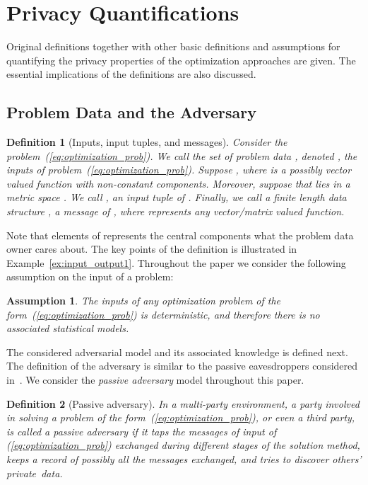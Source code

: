 \documentclass[12pt,draftcls,onecolumn]{IEEEtran}
\newtheorem{defin}{Definition}\newtheorem{assump}{Assumption}
\newcommand{\add}[1]{{{\color{blue!0!black}#1}}}
\newcommand{\addnew}[1]{{{\color{blue!0!black}#1}}}
\begin{document}
\section{Privacy Quantifications}\label{sec:definitions}

\addnew{Original definitions together with other basic definitions and assumptions for quantifying the privacy properties of the optimization approaches are given. The essential implications of the definitions are also discussed.}

\addnew{
\subsection{Problem Data and the Adversary}\label{subsec:definitions_data_advsry}
}

\addnew{
\begin{defin}[Inputs, input tuples, and messages]\label{def:input}
Consider the problem~(\ref{eq:optimization_prob}). We call the \emph{set of problem data} , denoted , the \emph{inputs} of problem~(\ref{eq:optimization_prob}). Suppose , where  is a possibly vector valued function with non-constant components. Moreover, suppose that  lies in a metric space . We call , an \emph{input tuple} of . Finally, we call a finite length data structure , a \emph{message} of , where  represents any vector/matrix valued function. \hfill 
\end{defin}
}
\addnew{Note that elements of  represents the central components what the problem data owner cares about. The key points of the definition is illustrated in Example~\ref{ex:input_output1}. Throughout the paper we consider the following assumption on the input of a problem:}
\addnew{
\begin{assump}\label{assump:input}
The inputs of any optimization problem of the form~(\ref{eq:optimization_prob}) is deterministic, and therefore there is no associated statistical models. \hfill 
\end{assump}
}
The considered adversarial model and its associated knowledge is defined next. The definition of the adversary is similar to the passive eavesdroppers considered in~\cite[\S~5.1-5.3]{Goldreich-book-2004}. We consider the \emph{passive adversary} model throughout this paper.





\begin{defin}[\add{Passive adversary}]\label{def:adversary}
\add{In a multi-party environment, a party involved in solving a problem of the form~(\ref{eq:optimization_prob}), or even a third party, is called a passive adversary if it taps the messages of input of (\ref{eq:optimization_prob}) exchanged during different stages of the solution method, keeps a record of possibly all the messages exchanged, and tries to discover others' private~data.}  \hfill 
\end{defin}
\end{document}
